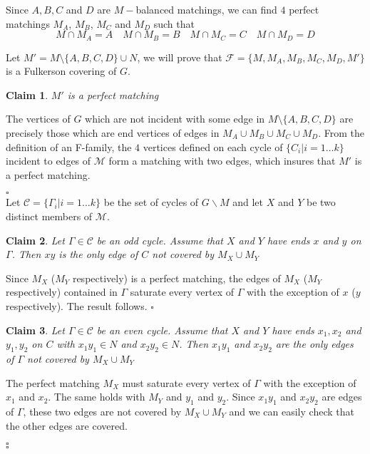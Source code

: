 \documentclass{amsart}
\newtheorem{Clm}{Claim}[thm]
\theoremstyle{definition}
\theoremstyle{remark}
\newenvironment{prf}{{\bf \noindent Proof } }{\hfill$\square$\\}
\newenvironment{PrfClaim}{{\bf Proof }}{{\hfill\tiny{$\square$\\}}}
\begin{document}
\begin{prf} Since $A,B,C$ and $D$ are $M-$balanced matchings, we can
find $4$ perfect matchings $M_{A}$, $M_{B}$, $M_{C}$ and $M_{D}$
such that
$$M \cap M_{A}=A \quad M \cap M_{B}=B \quad M \cap M_{C}=C \quad M \cap
M_{D}=D$$

Let $M'=M \setminus \{A,B,C,D\} \cup N$, we will prove that
$\mathcal F=\{M,M_{A},M_{B},M_{C},M_{D},M'\}$ is a Fulkerson
covering of $G$.



\begin{Clm}\label{Claim:NperfectMatching}
$M'$ is a perfect matching
\end{Clm}
\begin{PrfClaim}
The vertices of $G$ which are not incident with some edge in $M
\setminus \{A,B,C,D\}$ are precisely those which are end vertices of
edges in $M_A\cup M_B\cup M_C\cup M_D$. From the definition of an  F-family, the $4$
vertices defined on each cycle of $\{C_{i} | i=1 \ldots k\}$
incident to edges of $\mathcal M$ form a matching with two edges,
which insures that $M'$ is a perfect matching.

\end{PrfClaim}
Let $\mathcal C=\{\Gamma_{i} | i=1 \ldots k\}$ be the set of cycles
of $G \backslash M$ and let $X$ and $Y$ be two distinct members of
$\mathcal M$.
\begin{Clm}\label{Claim:OddCycles}
Let $\Gamma \in \mathcal C$ be an odd cycle. Assume that $X$ and $Y$
have ends $x$ and $y$ on $\Gamma$. Then  $xy$ is the only edge of
$C$ not covered by $M_{X} \cup M_{Y}$
\end{Clm}
\begin{PrfClaim}
Since $M_{X}$ ($M_{Y}$ respectively) is a perfect matching, the
edges of $M_{X}$ ($M_{Y}$ respectively) contained in $\Gamma$
saturate every vertex of $\Gamma$ with the exception of $x$ ($y$
respectively). The result follows.
\end{PrfClaim}


\begin{Clm}\label{Claim:EvenCyclesFirst}
Let $\Gamma \in \mathcal C$ be an even cycle. Assume that $X$ and
$Y$ have ends $x_{1},x_{2}$ and $y_{1},y_{2}$ on $C$ with
$x_{1}y_{1} \in N$ and $x_{2}y_{2} \in N$. Then $x_{1}y_{1}$ and
$x_{2}y_{2}$ are the only edges of $\Gamma$ not covered by $M_{X}
\cup M_{Y}$
\end{Clm}
\begin{PrfClaim} The perfect matching $M_{X}$ must saturate every vertex of
$\Gamma$ with the
exception of $x_{1}$ and $x_{2}$. The same holds with $M_{Y}$ and
$y_{1}$ and $y_{2}$. Since $x_1y_{1}$ and $x_{2}y_{2}$ are edges of
$\Gamma$, these two edges are not covered by $M_{X} \cup M_{Y}$ and we
can easily check that the other edges are covered.


\end{PrfClaim}
\end{prf}
\end{document}
